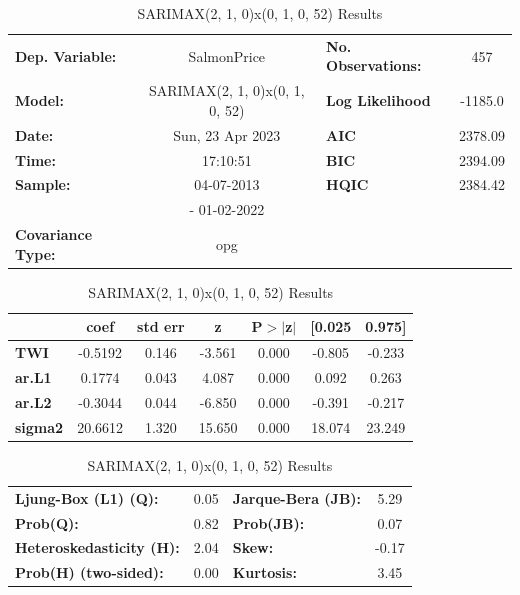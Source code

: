 \begin{table}[H]
    \begin{center}
        \begin{tabular}{lclc}
        \toprule
        \textbf{Dep. Variable:}          &          SalmonPrice           & \textbf{  No. Observations: } &    457      \\
        \textbf{Model:}                  & SARIMAX(2, 1, 0)x(0, 1, 0, 52) & \textbf{  Log Likelihood    } & -1185.0  \\
        \textbf{Date:}                   &        Sun, 23 Apr 2023        & \textbf{  AIC               } &  2378.09   \\
        \textbf{Time:}                   &            17:10:51            & \textbf{  BIC               } &  2394.09   \\
        \textbf{Sample:}                 &           04-07-2013           & \textbf{  HQIC              } &  2384.42   \\
        \textbf{}                        &          - 01-02-2022          & \textbf{                     } &             \\
        \textbf{Covariance Type:}        &              opg               & \textbf{                     } &             \\
        \bottomrule
        \end{tabular}
        \begin{tabular}{lcccccc}
                        & \textbf{coef} & \textbf{std err} & \textbf{z} & \textbf{P$> |$z$|$} & \textbf{[0.025} & \textbf{0.975]}  \\
        \midrule
        \textbf{TWI}    &      -0.5192  &        0.146     &    -3.561  &         0.000        &       -0.805    &       -0.233     \\
        \textbf{ar.L1}  &       0.1774  &        0.043     &     4.087  &         0.000        &        0.092    &        0.263     \\
        \textbf{ar.L2}  &      -0.3044  &        0.044     &    -6.850  &         0.000        &       -0.391    &       -0.217     \\
        \textbf{sigma2} &      20.6612  &        1.320     &    15.650  &         0.000        &       18.074    &       23.249     \\
        \bottomrule
        \end{tabular}
        \begin{tabular}{lclc}
        \textbf{Ljung-Box (L1) (Q):}     & 0.05 & \textbf{  Jarque-Bera (JB):  } &  5.29  \\
        \textbf{Prob(Q):}                & 0.82 & \textbf{  Prob(JB):          } &  0.07  \\
        \textbf{Heteroskedasticity (H):} & 2.04 & \textbf{  Skew:              } & -0.17  \\
        \textbf{Prob(H) (two-sided):}    & 0.00 & \textbf{  Kurtosis:          } &  3.45  \\
        \bottomrule
        \end{tabular}
        \caption{SARIMAX(2, 1, 0)x(0, 1, 0, 52) Results}
    \end{center}
\end{table}
